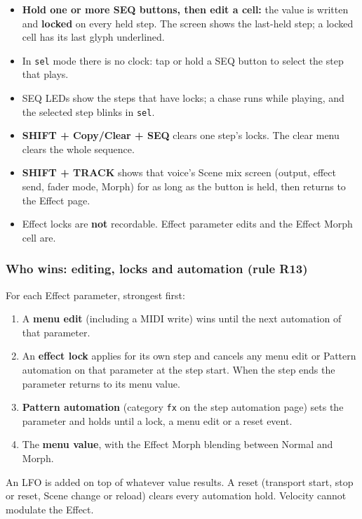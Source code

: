 \begin{itemize}
\tightlist
\item
  \textbf{Hold one or more SEQ buttons, then edit a cell:} the value is
  written and \textbf{locked} on every held step. The screen shows the
  last-held step; a locked cell has its last glyph underlined.
\item
  In \texttt{sel} mode there is no clock: tap or hold a SEQ button to
  select the step that plays.
\item
  SEQ LEDs show the steps that have locks; a chase runs while playing,
  and the selected step blinks in \texttt{sel}.
\item
  \textbf{SHIFT + Copy/Clear + SEQ} clears one step's locks. The clear
  menu clears the whole sequence.
\item
  \textbf{SHIFT + TRACK} shows that voice's Scene mix screen (output,
  effect send, fader mode, Morph) for as long as the button is held,
  then returns to the Effect page.
\item
  Effect locks are \textbf{not} recordable. Effect parameter edits and
  the Effect Morph cell are.
\end{itemize}

\subsubsection{Who wins: editing, locks and automation (rule
R13)}\label{who-wins-editing-locks-and-automation-rule-r13}

For each Effect parameter, strongest first:

\begin{enumerate}
\def\labelenumi{\arabic{enumi}.}
\tightlist
\item
  A \textbf{menu edit} (including a MIDI write) wins until the next
  automation of that parameter.
\item
  An \textbf{effect lock} applies for its own step and cancels any menu
  edit or Pattern automation on that parameter at the step start. When
  the step ends the parameter returns to its menu value.
\item
  \textbf{Pattern automation} (category \texttt{fx} on the step
  automation page) sets the parameter and holds until a lock, a menu
  edit or a reset event.
\item
  The \textbf{menu value}, with the Effect Morph blending between Normal
  and Morph.
\end{enumerate}

An LFO is added on top of whatever value results. A reset (transport
start, stop or reset, Scene change or reload) clears every automation
hold. Velocity cannot modulate the Effect.


